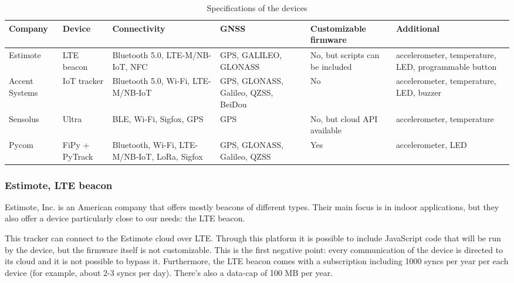 \begin{table}[h]
\centering
{}
\begin{tabularx}{\textwidth}{YYYYYY}
\toprule
\textbf{Company}        & \textbf{Device}         & \textbf{Connectivity}                                                          & \textbf{GNSS}                                & \textbf{Customizable firmware}           & \textbf{Additional}                                           \\ \midrule
Estimote       & LTE beacon     & Bluetooth 5.0, LTE-M/NB-IoT, NFC                                      & GPS, GALILEO, GLONASS               & No, but scripts can be included & accelerometer, temperature, LED, programmable button \\ \midrule
Accent Systems & IoT tracker    & Bluetooth 5.0, Wi-Fi, LTE-M/NB-IoT                                    & GPS, GLONASS, Galileo, QZSS, BeiDou & No                              & accelerometer, temperature, LED, buzzer              \\ \midrule
Sensolus       & Ultra          & BLE, Wi-Fi, Sigfox, GPS                                               & GPS                                 & No, but cloud API available     & accelerometer, temperature                           \\ \midrule
Pycom          & FiPy + PyTrack & Bluetooth, Wi-Fi, LTE-M/NB-IoT, LoRa, Sigfox & GPS, GLONASS, Galileo, QZSS         & Yes                             & accelerometer, LED                                   \\ \bottomrule
\end{tabularx}
\caption{Specifications of the devices}
\label{table_devices}
\end{table}

\subsubsection{Estimote, LTE beacon}
Estimote, Inc. \cite{estimote} is an American company that offers mostly beacons of different types. Their main focus is in indoor applications, but they also offer a device particularly close to our needs: the LTE beacon.

This tracker can connect to the Estimote cloud over LTE. Through this platform it is possible to include JavaScript code that will be run by the device, but the firmware itself is not customizable. This is the first negative point: every communication of the device is directed to its cloud and it is not possible to bypass it. Furthermore, the LTE beacon comes with a subscription including 1000 syncs per year per each device (for example, about 2-3 syncs per day). There’s also a data-cap of 100 MB per year.

